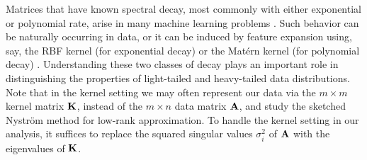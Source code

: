 \documentclass[thesis.tex]{subfiles}
\begin{document}
Matrices that have known spectral decay, most commonly with either
exponential or polynomial rate, arise in many machine
learning problems \cite{randomized-newton}. Such behavior can be naturally
occurring in data, or it can be induced by feature expansion using, say, the
RBF kernel (for exponential decay) \cite{Santa97Gaussianregression} or the
Mat\'ern kernel (for polynomial decay) \cite{RasmussenWilliams06}. Understanding these
two classes of decay plays an important role in distinguishing the
properties of light-tailed and heavy-tailed data distributions.
Note that in the kernel setting we may often represent our data via
the $m\times m$ kernel matrix $\mathbf K$, instead of the $m\times n$ data
matrix $\mathbf A$, and study the sketched Nystr\"om method
\cite{revisiting-nystrom} for low-rank approximation. To handle 
the kernel setting in our analysis, it suffices to replace the squared singular
values $\sigma_i^2$ of $\mathbf A$ with the eigenvalues of $\mathbf K$.
\end{document}
